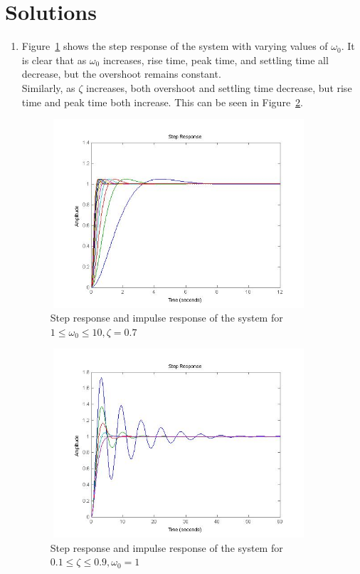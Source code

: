 \documentclass[letterpaper, 11pt, openany]{book}
\begin{document}
\section{Solutions}
\begin{enumerate}
\item Figure~\ref{fig:VaryOmega} shows the  step response of the system with varying values 
of $\omega_0$. It is clear that as $\omega_0$ increases, rise time, peak time, and settling time 
all decrease, but the overshoot remains constant. \\
Similarly, as $\zeta$ increases, both overshoot and settling time decrease, but rise time and 
peak time both increase. This can be seen in Figure~\ref{fig:VaryZeta}. 


\begin{figure}[htbp]
\centering
\includegraphics[width=0.9\textwidth, height = 7cm]{graphics/VaryOmega.jpg} 
\caption{Step response and impulse response of the system for $1 \leq \omega_0 \leq 10, \zeta = 0.7$}\label{fig:VaryOmega}
\end{figure}

\begin{figure}[htbp]
\centering
\includegraphics[width=0.9\textwidth, height = 7cm]{graphics/VaryZeta.jpg} 
\caption{Step response and impulse response of the system for $0.1 \leq \zeta \leq 0.9, \omega_0 = 1$}\label{fig:VaryZeta}
\end{figure}


\end{enumerate}
\end{document}
